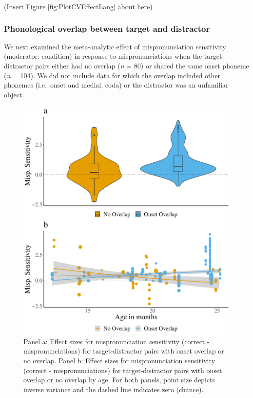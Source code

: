 \documentclass[man, noextraspace]{apa6}
\begin{document}
(Insert Figure \ref{fig:PlotCVEffectLang} about here)

\hypertarget{phonological-overlap-between-target-and-distractor}{%
\subsubsection{Phonological overlap between target and distractor}\label{phonological-overlap-between-target-and-distractor}}

We next examined the meta-analytic effect of mispronunciation sensitivity (moderator: condition) in response to mispronunciations when the target-distractor pairs either had no overlap (\emph{n} = 80) or shared the same onset phoneme (\emph{n} = 104). We did not include data for which the overlap included other phonemes (i.e.~onset and medial, coda) or the distractor was an unfamiliar object.

\begin{figure}
\centering
\includegraphics{VonHolzenBergmann_MPMetaAnalysis_files/figure-latex/PlotDistOverlap-1.pdf}
\caption{\label{fig:PlotDistOverlap}Panel a: Effect sizes for mispronunciation sensitivity (correct - mispronunciations) for target-distractor pairs with onset overlap or no overlap. Panel b: Effect sizes for mispronunciation sensitivity (correct - mispronunciations) for target-distractor pairs with onset overlap or no overlap by age. For both panels, point size depicts inverse variance and the dashed line indicates zero (chance).}
\end{figure}
\end{document}
